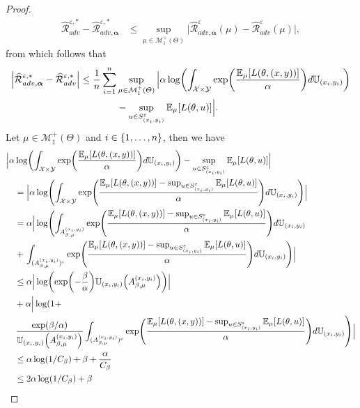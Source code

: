 \begin{proof}
\begin{align*}
     \widehat{\mathcal{R}}_{adv}^{\varepsilon,*}-\widehat{\mathcal{R}}_{adv,\bm{\alpha}}^{\varepsilon,*}&\leq \sup_{\mu\in\mathcal{M}_1^{+}(\Theta)}\Big|\widehat{\mathcal{R}}_{adv,\bm{\alpha}}^{\varepsilon}(\mu) -   \widehat{\mathcal{R}}_{adv}^{\varepsilon}(\mu)  \Big|,
\end{align*}
from which follows that
\begin{align*}
 \Big| \widehat{\mathcal{R}}_{adv,\bm{\alpha}}^{\varepsilon,*} - \widehat{\mathcal{R}}_{adv}^{\varepsilon,*}\Big|\leq \frac{1}{\numsamples}\sum_{i=1}^\numsamples&\sup_{\mu\in\mathcal{M}_1^{+}(\Theta)}\Big|\alpha\log\left(\int_{\mathcal{X}\times\mathcal{Y}}\exp\left(\frac{\mathbb{E}_{\mu}[\loss(\theta,(x,y))]}{\alpha} \right) d\mathbb{U}_{(x_i,y_i)}\right)\\
 &-\sup_{u\in S^{\varepsilon}_{(x_i,y_i)}}\mathbb{E}_{\mu}[\loss(\theta,u)] \Big|.
\end{align*}
Let $\mu\in\mathcal{M}_1^{+}(\Theta)$ and $i\in\{1,\dots,n\}$, then we have
\begin{align*}
 \Big|\alpha&\log\left(\int_{\mathcal{X}\times\mathcal{Y}}\exp\left(\frac{\mathbb{E}_{\mu}[\loss(\theta,(x,y))]}{\alpha} \right) d\mathbb{U}_{(x_i,y_i)}\right)-\sup_{u\in S^{\varepsilon}_{(x_i,y_i)}}\mathbb{E}_{\mu}[\loss(\theta,u)] \Big|\\
 &=\Big|\alpha\log\left(\int_{\mathcal{X}\times\mathcal{Y}}\exp\left(\frac{\mathbb{E}_{\mu}[\loss(\theta,(x,y))]-\sup_{u\in S^{\varepsilon}_{(x_i,y_i)}}\mathbb{E}_{\mu}[\loss(\theta,u)]}{\alpha} \right) d\mathbb{U}_{(x_i,y_i)}\right) \Big|  \\
 &=\alpha  \Big| \log\left(\int_{A_{\beta,\mu}^{(x_i,y_i)}}\exp\left(\frac{\mathbb{E}_{\mu}[\loss(\theta,(x,y))]-\sup_{u\in S^{\varepsilon}_{(x_i,y_i)}}\mathbb{E}_{\mu}[\loss(\theta,u)]}{\alpha} \right) d\mathbb{U}_{(x_i,y_i)}\right. \\
 &+ \left.\int_{(A_{\beta,\mu}^{(x_i,y_i)})^{c}}\exp\left(\frac{\mathbb{E}_{\mu}[\loss(\theta,(x,y))]-\sup_{u\in S^{\varepsilon}_{(x_i,y_i)}}\mathbb{E}_{\mu}[\loss(\theta,u)]}{\alpha} \right) d\mathbb{U}_{(x_i,y_i)}\right)  \Big|\\
 &\leq \alpha \Big | \log\left(\exp(-\frac\beta\alpha)\mathbb{U}_{(x_i,y_i)}\left(A_{\beta,\mu}^{(x_i,y_i)}\right) \right)\Big | \\
 &+ \alpha  \Big|\log\left(1+\right.\\
 &\left.\frac{\exp(\beta/\alpha)}{\mathbb{U}_{(x_i,y_i)}\left(A_{\beta,\mu}^{(x_i,y_i)}\right)}\int_{(A_{\beta,\mu}^{(x_i,y_i)})^{c}}\exp\left(\frac{\mathbb{E}_{\mu}[\loss(\theta,(x,y))]-\sup_{u\in S^{\varepsilon}_{(x_i,y_i)}}\mathbb{E}_{\mu}[\loss(\theta,u)]}{\alpha} \right) d\mathbb{U}_{(x_i,y_i)}\right)  \Big|\\
 &\leq \alpha\log(1/C_\beta)+\beta +\frac{\alpha}{C_\beta}\\
 &\leq 2\alpha\log(1/C_\beta)+\beta
\end{align*}
\end{proof}



